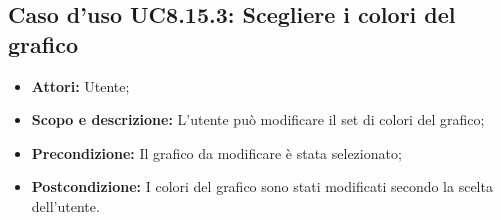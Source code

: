 \subsection{Caso d'uso UC8.15.3: Scegliere i colori del grafico}
\begin{itemize}
	\item \textbf{Attori:} Utente;
	\item \textbf{Scopo e descrizione:} L'utente può modificare il set di colori del grafico;
	\item \textbf{Precondizione:} Il grafico da modificare è stata selezionato;
	\item \textbf{Postcondizione:} I colori del grafico sono stati modificati secondo la scelta dell'utente.
\end{itemize}